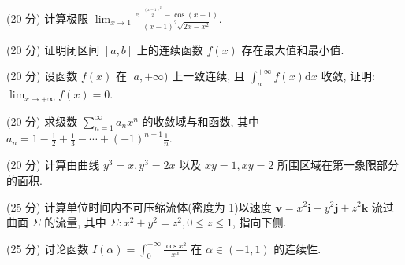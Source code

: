 \par{}
(20 分) 计算极限 $\lim_{x\to 1}\frac{e^{-\frac{(x - 1)^2}{2}} - \cos(x - 1)}{(x - 1)^2\sqrt{2x - x^2}}.$\par
\par{}
(20 分) 证明闭区间 $[a, b]$ 上的连续函数 $f(x)$ 存在最大值和最小值.\par
\par{}
(20 分) 设函数 $f(x)$ 在 $[a, +\infty)$ 上一致连续, 且 $\int_{a}^{+\infty} f(x) \mathrm{d}x$ 收敛, 证明: $\lim_{x \to +\infty} f(x) = 0$.\par
\par{}
(20 分) 求级数 $\sum_{n=1}^{\infty} a_n x^n$ 的收敛域与和函数, 其中 $a_n = 1 - \frac{1}{2} + \frac{1}{3} - \cdots + (-1)^{n-1} \frac{1}{n}$.\par
\par{}
(20 分) 计算由曲线 $y^{3} = x, y^{3} = 2x$ 以及 $xy = 1, xy = 2$ 所围区域在第一象限部分的面积.\par
\par{}
(25 分) 计算单位时间内不可压缩流体(密度为 1)以速度 $\boldsymbol{v} = x^{2}\boldsymbol{i} + y^{2}\boldsymbol{j} + z^{2}\boldsymbol{k}$ 流过曲面 $\Sigma$ 的流量, 其中 $\Sigma: x^{2} + y^{2} = z^{2}, 0 \leq z \leq 1$, 指向下侧.\par
\par{}
(25 分) 讨论函数 $I(\alpha) = \int_{0}^{+\infty} \frac{\cos x^2}{x^\alpha}$ 在 $\alpha \in (-1, 1)$ 的连续性.\par
